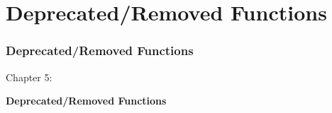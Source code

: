 %

\section{Deprecated/Removed Functions}
\begin{frame}[fragile]
	\frametitle{Deprecated/Removed Functions}

	\begin{center}\huge{Chapter 5:}\end{center}
	\begin{center}\huge{\color{typo3darkgrey}\textbf{Deprecated/Removed Functions}}\end{center}

\end{frame}



